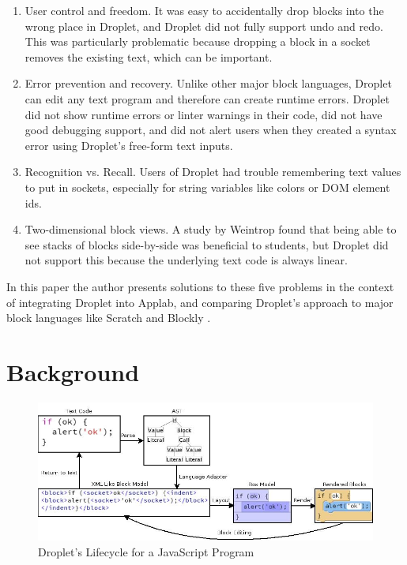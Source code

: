 \documentclass[conference]{IEEEtran}
\begin{document}
\begin{enumerate}
  \item User control and freedom. It was easy to accidentally drop blocks into the wrong place in Droplet, and Droplet did not fully support undo and redo. This was particularly problematic because dropping a block in a socket removes the existing text, which can be important.
  \item Error prevention and recovery. Unlike other major block languages, Droplet can edit any text program and therefore can create runtime errors. Droplet did not show runtime errors or linter warnings in their code, did not have good debugging support, and did not alert users when they created a syntax error using Droplet's free-form text inputs.
  \item Recognition vs. Recall. Users of Droplet had trouble remembering text values to put in sockets, especially for string variables like colors or DOM element ids.
  \item Two-dimensional block views. A study by Weintrop \cite{Weintrop} found that being able to see stacks of blocks side-by-side was beneficial to students, but Droplet did not support this because the underlying text code is always linear.
\end{enumerate}

In this paper the author presents solutions to these five problems in the context of integrating Droplet into Applab, and comparing Droplet's approach to major block languages like Scratch \cite{Scratch} and Blockly \cite{Blockly}.

\section{Background}
\begin{figure}
\centering
\includegraphics[width=5in]{lifecycle.jpg}
\caption{Droplet's Lifecycle for a JavaScript Program}
\label{lifecycle}
\end{figure}
\end{document}
